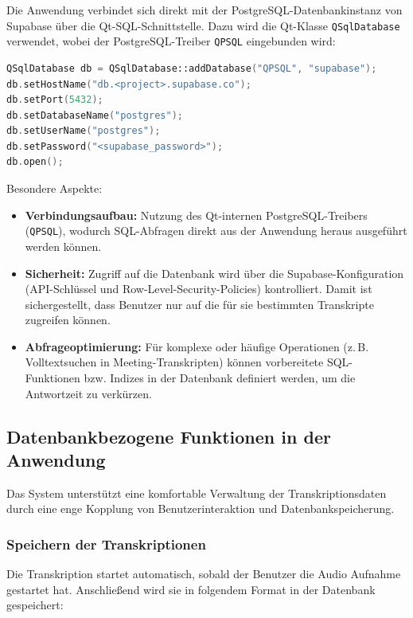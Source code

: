 Die Anwendung verbindet sich direkt mit der PostgreSQL-Datenbankinstanz von Supabase über die 
Qt-SQL-Schnittstelle. Dazu wird die Qt-Klasse \texttt{QSqlDatabase} verwendet, wobei der 
PostgreSQL-Treiber \texttt{QPSQL} eingebunden wird:

\begin{lstlisting}[language=C++, caption={Herstellen einer Verbindung mit Supabase über QSqlDatabase}]
QSqlDatabase db = QSqlDatabase::addDatabase("QPSQL", "supabase");
db.setHostName("db.<project>.supabase.co");
db.setPort(5432);
db.setDatabaseName("postgres");
db.setUserName("postgres");
db.setPassword("<supabase_password>");
db.open();
\end{lstlisting}

Besondere Aspekte:
\begin{itemize}
    \item \textbf{Verbindungsaufbau:} Nutzung des Qt-internen PostgreSQL-Treibers (\texttt{QPSQL}), 
    wodurch SQL-Abfragen direkt aus der Anwendung heraus ausgeführt werden können.
    \item \textbf{Sicherheit:} Zugriff auf die Datenbank wird über die Supabase-Konfiguration 
    (API-Schlüssel und Row-Level-Security-Policies) kontrolliert. Damit ist sichergestellt, 
    dass Benutzer nur auf die für sie bestimmten Transkripte zugreifen können.
    \item \textbf{Abfrageoptimierung:} Für komplexe oder häufige Operationen (z.\,B. Volltextsuchen 
    in Meeting-Transkripten) können vorbereitete SQL-Funktionen bzw. Indizes in der Datenbank 
    definiert werden, um die Antwortzeit zu verkürzen.
\end{itemize}

\subsection{Datenbankbezogene Funktionen in der Anwendung}
\label{sec:loesung:db_laden_speichern}

Das System unterstützt eine komfortable Verwaltung der Transkriptionsdaten durch eine enge Kopplung von Benutzerinteraktion und Datenbankspeicherung.

\subsubsection{Speichern der Transkriptionen}

Die Transkription startet automatisch, sobald der Benutzer die Audio Aufnahme gestartet hat. Anschließend wird sie in folgendem Format in der Datenbank gespeichert:

